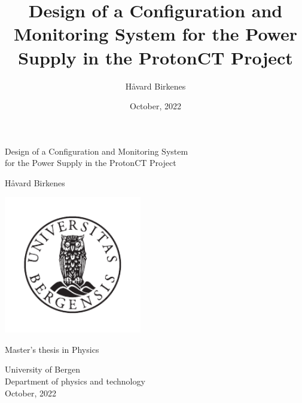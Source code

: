 \documentclass[12pt]{article}
\title{Design of a Configuration and Monitoring System for the Power Supply in the ProtonCT Project}
\author{Håvard Birkenes}
\date{October, 2022}
\begin{document}
\renewcommand{\notinmain}[1]{}
\begin{titlepage}
    \begin{center}
        \vspace*{1cm}
            
        \LARGE
        Design of a Configuration and Monitoring System \\
        for the Power Supply in the ProtonCT Project
            

        \large
        \vspace{1cm}
        Håvard Birkenes
            
        \vspace{2cm}
        
         \includegraphics[width=0.45\textwidth]{images/UiB-emblem_gray.pdf}
            
        \vspace{1.3cm}
         Master's thesis in Physics
        \vspace{0.4cm}
            
       
            
        \LARGE
        University of Bergen\\
        Department of physics and technology\\
        \vspace{0.6cm}
        \Large
        October, 2022
            
    \end{center}
\end{titlepage}

     
    \newpage
    \
    \newpage
  
    
    \newpage
      \restoregeometry
    \tableofcontents
    \newpage
    \printglossary
    \printglossary[type=\acronymtype]
    \newpage
    
    \newpage
\end{document}
